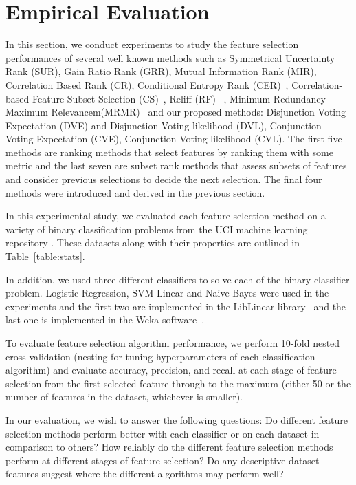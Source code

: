 \section{Empirical Evaluation}

In this section, we conduct experiments to study the feature selection
performances of several well known methods such as Symmetrical
Uncertainty Rank (SUR), Gain Ratio Rank (GRR), Mutual Information Rank
(MIR), Correlation Based Rank (CR), Conditional Entropy Rank
(CER)~\cite{guyon_jmlr03}, Correlation-based Feature Subset Selection
(CS)~\cite{Hall1998}, Reliff (RF)~\cite{Robnik-Sikonja2003} , Minimum
Redundancy Maximum Relevancem(MRMR)~\cite{peng2005} and our proposed
methods: Disjunction Voting Expectation (DVE) and Disjunction Voting
likelihood (DVL), Conjunction Voting Expectation (CVE), Conjunction
Voting likelihood (CVL).  The first five methods are ranking methods
that select features by ranking them with some metric and the last
seven are subset rank methods that assess subsets of features and
consider previous selections to decide the next selection.  The final
four methods were introduced and derived in the previous section.

In this experimental study, we evaluated each feature selection
method on a variety of binary classification problems 
from the UCI machine learning repository \cite{Bache+Lichman:2013}.
These datasets along with their properties are outlined in 
Table~\ref{table:stats}.

In addition, we used three different classifiers to solve each of the
binary classifier problem. Logistic Regression, SVM Linear and Naive
Bayes were used in the experiments and the first two are implemented
in the LibLinear library~\cite{REF08a} and the last one is implemented in
the Weka software~\cite{weka}.
 
To evaluate feature selection algorithm performance, we perform 
10-fold nested cross-validation (nesting for tuning hyperparameters of each classification
algorithm) and evaluate accuracy, precision, and recall at each stage of
feature selection from the first selected feature through to the maximum
(either 50 or the number of features in the dataset, whichever is smaller).

In our evaluation, we wish to answer the following questions:
Do different feature selection methods perform better with
each classifier or on each dataset in comparison to others?
How reliably do the different feature selection methods perform at
different stages of feature selection?  
Do any descriptive dataset features suggest where the different 
algorithms may perform well?

